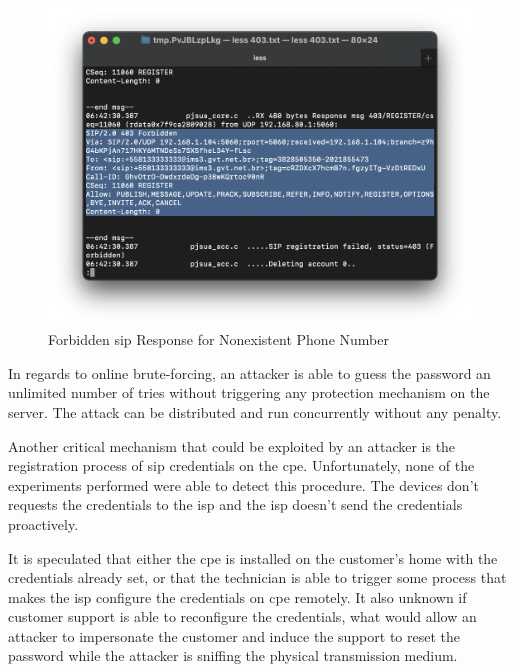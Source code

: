 \begin{figure}[h]
    \centering
    \includegraphics[width=\linewidth]{contents/isp-side-services-analysis/sip/sip-403.png}
    \caption{Forbidden \gls{sip} Response for Nonexistent Phone Number}
    \label{figure:sip_403}
\end{figure}

In regards to online brute-forcing, an attacker is able to guess the password an unlimited number of tries without triggering any protection mechanism on the server. The attack can be distributed and run concurrently without any penalty.

Another critical mechanism that could be exploited by an attacker is the registration process of \gls{sip} credentials on the \gls{cpe}. Unfortunately, none of the experiments performed were able to detect this procedure. The devices don't requests the credentials to the \gls{isp} and the \gls{isp} doesn't send the credentials proactively.

It is speculated that either the \gls{cpe} is installed on the customer's home with the credentials already set, or that the technician is able to trigger some process that makes the \gls{isp} configure the credentials on \gls{cpe} remotely. It also unknown if customer support is able to reconfigure the credentials, what would allow an attacker to impersonate the customer and induce the support to reset the password while the attacker is sniffing the physical transmission medium.

\FloatBarrier
